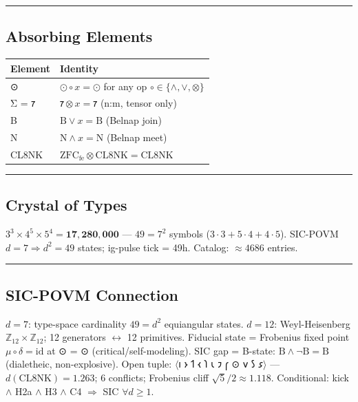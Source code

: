 \documentclass[12pt,a4paper]{article}
\newcommand{\heb}[1]{{\igprimfont #1}}
\begin{document}
\begin{center}\rule{0.5\linewidth}{0.5pt}\end{center}

\hypertarget{absorbing-elements}{%
\subsection{Absorbing Elements}\label{absorbing-elements}}

\begin{longtable}[]{@{}ll@{}}
\toprule
Element & Identity\tabularnewline
\midrule
\endhead
\heb{⊙} & \(\odot \circ x = \odot\) for any op
\(\circ \in \{\wedge, \vee, \otimes\}\)\tabularnewline
\heb{Σ} = 𐑳 & \(\text{𐑳} \otimes x = \text{𐑳}\) (n:m, tensor
only)\tabularnewline
B & \(\mathrm{B} \vee x = \mathrm{B}\) (Belnap join)\tabularnewline
N & \(\mathrm{N} \wedge x = \mathrm{N}\) (Belnap meet)\tabularnewline
CL8NK &
\(\mathrm{ZFC}_\mathrm{fe} \otimes \mathrm{CL8NK} = \mathrm{CL8NK}\)\tabularnewline
\bottomrule
\end{longtable}

\begin{center}\rule{0.5\linewidth}{0.5pt}\end{center}

\hypertarget{crystal-of-types}{%
\subsection{Crystal of Types}\label{crystal-of-types}}

\(3^3 \times 4^5 \times 5^4 = \mathbf{17{,}280{,}000}\) --- \(49 = 7^2\)
symbols (\(3{\cdot}3 + 5{\cdot}4 + 4{\cdot}5\)). SIC-POVM
\(d=7 \Rightarrow d^2=49\) states; ig-pulse tick = 49h. Catalog:
\({\approx}4686\) entries.

\begin{center}\rule{0.5\linewidth}{0.5pt}\end{center}

\hypertarget{sic-povm-connection}{%
\subsection{SIC-POVM Connection}\label{sic-povm-connection}}

\(d=7\): type-space cardinality \(49 = d^2\) equiangular states.
\(d=12\): Weyl-Heisenberg \(\mathbb{Z}_{12}{\times}\mathbb{Z}_{12}\); 12
generators \(\leftrightarrow\) 12 primitives. Fiducial state = Frobenius
fixed point \(\mu\circ\delta=\mathrm{id}\) at \heb{⊙} = ⊙
(critical/self-modeling). SIC gap = B-state:
\(\mathrm{B} \wedge \neg\mathrm{B} = \mathrm{B}\) (dialetheic,
non-explosive). Open tuple: \(\langle\)𐑦 𐑶 𐑑 𐑬 𐑐 𐑧 𐑲 𐑝 ⊙ 𐑫 𐑕
𐑭\(\rangle\) --- \(d(\mathrm{CL8NK}) = 1.263\); 6 conflicts; Frobenius
cliff \(\sqrt{5}/2 \approx 1.118\). Conditional: kick \(\wedge\) H2a
\(\wedge\) H3 \(\wedge\) C4 \(\Rightarrow\) SIC \(\forall d \geq 1\).
\end{document}
